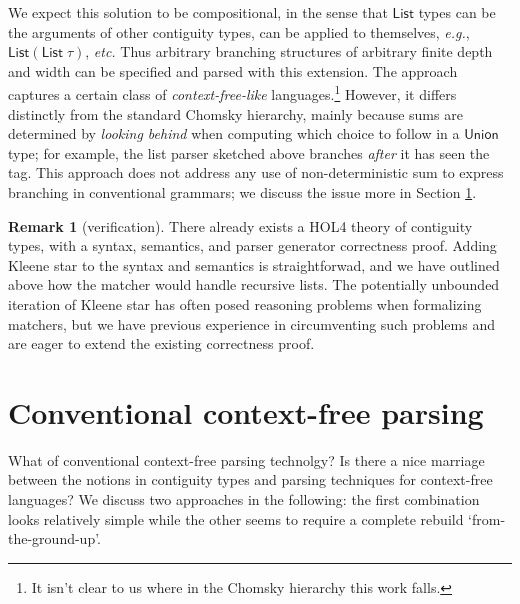 \documentclass{article}
\newcommand{\eg}{\textit{e.g.}}
\newcommand{\etc}{\textit{etc.}}
\newcommand{\konst}[1]{\ensuremath{\mathsf{#1}}}
\theoremstyle{definition}
\newtheorem{remark}{Remark}
\begin{document}
We expect this solution to be compositional, in the sense that
\konst{List} types can be the arguments of other contiguity types, can
be applied to themselves, \eg, $\konst{List}(\konst{List}\;\tau)$,
\etc \; Thus arbitrary branching structures of arbitrary finite depth
and width can be specified and parsed with this extension.  The
approach captures a certain class of \emph{context-free-like}
languages.\footnote{It isn't clear to us where in the Chomsky
  hierarchy this work falls.}  However, it differs distinctly from the
standard Chomsky hierarchy, mainly because sums are determined by
\emph{looking behind} when computing which choice to follow in a
\konst{Union} type; for example, the list parser sketched above
branches \emph{after} it has seen the tag. This approach does not
address any use of non-deterministic sum to express branching in
conventional grammars; we discuss the issue more in Section \ref{cfl}.

\begin{remark} [verification] There already exists a
  HOL4 theory of contiguity types, with a syntax, semantics, and
  parser generator correctness proof. Adding Kleene star to the syntax
  and semantics is straightforwad, and we have outlined above how the
  matcher would handle recursive lists.  The potentially unbounded
  iteration of Kleene star has often posed reasoning problems when
  formalizing matchers, but we have previous experience in
  circumventing such problems and are eager to extend the existing
  correctness proof.
\end{remark}




\section{Conventional context-free parsing}
\label{cfl}

What of conventional context-free parsing technolgy? Is there a nice
marriage between the notions in contiguity types and parsing
techniques for context-free languages? We discuss two approaches in
the following: the first combination looks relatively simple while the
other seems to require a complete rebuild `from-the-ground-up'.
\end{document}
